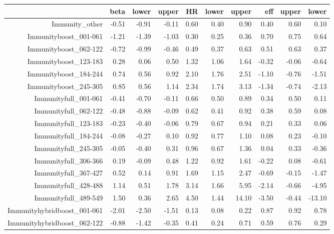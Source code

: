\begin{table}[ht]
\centering
\begin{tabular}{rrrrrrrrrr}
  \hline
 & beta & lower & upper & HR & lower & upper & eff & upper & lower \\ 
  \hline
Immunity\_other & -0.51 & -0.91 & -0.11 & 0.60 & 0.40 & 0.90 & 0.40 & 0.60 & 0.10 \\ 
  Immunityboost\_001-061 & -1.21 & -1.39 & -1.03 & 0.30 & 0.25 & 0.36 & 0.70 & 0.75 & 0.64 \\ 
  Immunityboost\_062-122 & -0.72 & -0.99 & -0.46 & 0.49 & 0.37 & 0.63 & 0.51 & 0.63 & 0.37 \\ 
  Immunityboost\_123-183 & 0.28 & 0.06 & 0.50 & 1.32 & 1.06 & 1.64 & -0.32 & -0.06 & -0.64 \\ 
  Immunityboost\_184-244 & 0.74 & 0.56 & 0.92 & 2.10 & 1.76 & 2.51 & -1.10 & -0.76 & -1.51 \\ 
  Immunityboost\_245-305 & 0.85 & 0.56 & 1.14 & 2.34 & 1.74 & 3.13 & -1.34 & -0.74 & -2.13 \\ 
  Immunityfull\_001-061 & -0.41 & -0.70 & -0.11 & 0.66 & 0.50 & 0.89 & 0.34 & 0.50 & 0.11 \\ 
  Immunityfull\_062-122 & -0.48 & -0.88 & -0.09 & 0.62 & 0.41 & 0.92 & 0.38 & 0.59 & 0.08 \\ 
  Immunityfull\_123-183 & -0.23 & -0.40 & -0.06 & 0.79 & 0.67 & 0.94 & 0.21 & 0.33 & 0.06 \\ 
  Immunityfull\_184-244 & -0.08 & -0.27 & 0.10 & 0.92 & 0.77 & 1.10 & 0.08 & 0.23 & -0.10 \\ 
  Immunityfull\_245-305 & -0.05 & -0.40 & 0.31 & 0.96 & 0.67 & 1.36 & 0.04 & 0.33 & -0.36 \\ 
  Immunityfull\_306-366 & 0.19 & -0.09 & 0.48 & 1.22 & 0.92 & 1.61 & -0.22 & 0.08 & -0.61 \\ 
  Immunityfull\_367-427 & 0.52 & 0.14 & 0.91 & 1.69 & 1.15 & 2.47 & -0.69 & -0.15 & -1.47 \\ 
  Immunityfull\_428-488 & 1.14 & 0.51 & 1.78 & 3.14 & 1.66 & 5.95 & -2.14 & -0.66 & -4.95 \\ 
  Immunityfull\_489-549 & 1.50 & 0.36 & 2.65 & 4.50 & 1.44 & 14.10 & -3.50 & -0.44 & -13.10 \\ 
  Immunityhybridboost\_001-061 & -2.01 & -2.50 & -1.51 & 0.13 & 0.08 & 0.22 & 0.87 & 0.92 & 0.78 \\ 
  Immunityhybridboost\_062-122 & -0.88 & -1.42 & -0.35 & 0.41 & 0.24 & 0.71 & 0.59 & 0.76 & 0.29 \\ 

\end{tabular}
\end{table}
